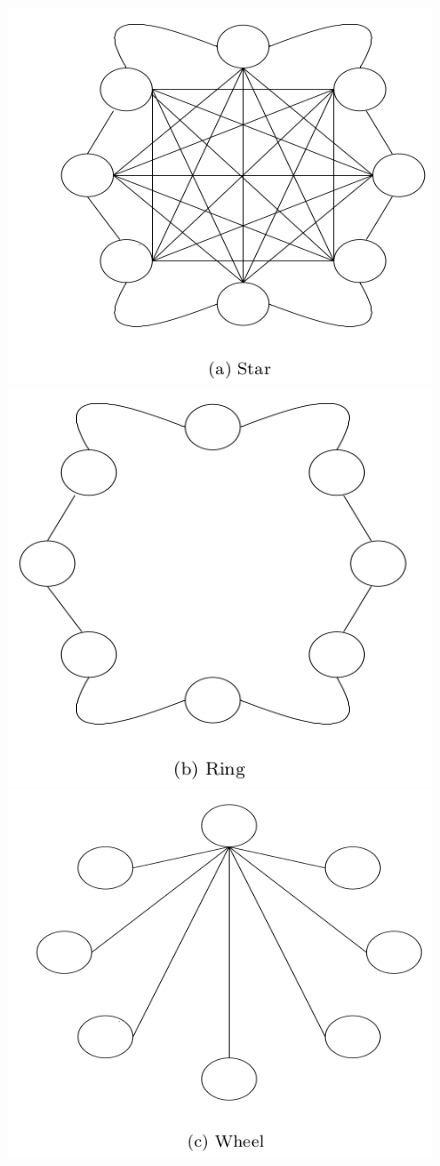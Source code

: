 \documentclass[a4paper]{article}
\begin{document}
\begin{figure}[htp]
    \centering
    \includegraphics[scale=0.2]{Star.png}
    \includegraphics[scale=0.2]{Ring.png}
    \includegraphics[scale=0.2]{Wheel.png}

\end{figure}
\end{document}
